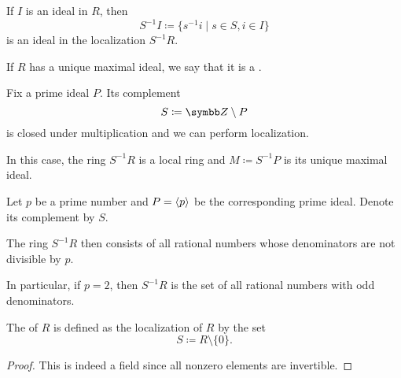 \begin{proposition}\label{thm:ring_localization_preserves_ideals}\cite[432]{Knapp2016BAlg}
  If \( I \) is an ideal in \( R \), then
  \begin{equation*}
    S^{-1} I \coloneqq \{ s^{-1} i \mid s \in S, i \in I \}
  \end{equation*}
  is an ideal in the localization \( S^{-1} R \).
\end{proposition}

\begin{definition}\label{def:local_ring}
  If \( R \) has a unique maximal ideal, we say that it is a .
\end{definition}

\begin{proposition}\label{thm:localization_of_prime_is_local}\cite[corollary 8.50]{Knapp2016BAlg}
  Fix a prime ideal \( P \). Its complement
  \begin{equation*}
    S \coloneqq \Z \setminus P
  \end{equation*}
  is closed under multiplication and we can perform localization.

  In this case, the ring \( S^{-1} R \) is a local ring and \( M \coloneqq S^{-1} P \) is its unique maximal ideal.
\end{proposition}

\begin{example}\label{ex:ring_localization}\cite[430]{Knapp2016BAlg}
  Let \( p \) be a prime number and \( P = \left\langle p \right\rangle \) be the corresponding prime ideal. Denote its complement by \( S \).

  The ring \( S^{-1} R \) then consists of all rational numbers whose denominators are not divisible by \( p \).

  In particular, if \( p = 2 \), then \( S^{-1} R \) is the set of all rational numbers with odd denominators.
\end{example}

\begin{definition}\label{def:field_of_fractions}
  The  of \( R \) is defined as the localization of \( R \) by the set
  \begin{equation*}
    S \coloneqq R \setminus \{ 0 \}.
  \end{equation*}
\end{definition}
\begin{proof}
  This is indeed a field since all nonzero elements are invertible.
\end{proof}
